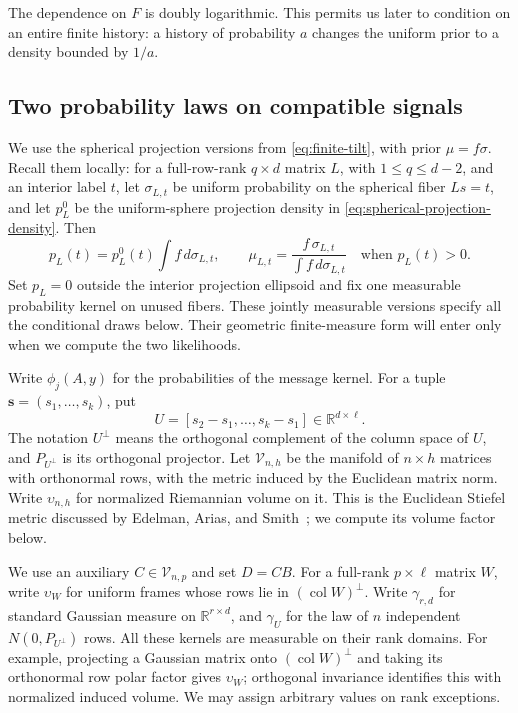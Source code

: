 The dependence on \(F\) is doubly logarithmic.  This permits us later to
condition on an entire finite history: a history of probability \(a\)
changes the uniform prior to a density bounded by \(1/a\).

\subsection{Two probability laws on compatible signals}
\label{inc:laws}

We use the spherical projection versions from
\eqref{eq:finite-tilt}, with prior \(\mu=f\sigma\).  Recall them locally:
for a full-row-rank \(q\times d\) matrix \(L\), with
\(1\le q\le d-2\), and an interior label \(t\), let
\(\sigma_{L,t}\) be uniform probability on the spherical fiber \(Ls=t\),
and let \(p_L^0\) be the uniform-sphere projection density in
\eqref{eq:spherical-projection-density}.  Then
\begin{equation}\label{inc:recalled-fibers}
 p_L(t)=p_L^0(t)\int f\,d\sigma_{L,t},\qquad
 \mu_{L,t}=\frac{f\,\sigma_{L,t}}{\int f\,d\sigma_{L,t}}
 \quad\text{when }p_L(t)>0.
\end{equation}
Set \(p_L=0\) outside the interior projection ellipsoid and fix one
measurable probability kernel on unused fibers.  These jointly measurable
versions specify all the conditional draws below.  Their geometric
finite-measure form will enter only when we compute the two likelihoods.

Write \(\phi_j(A,y)\) for the probabilities of the message kernel.
For a tuple \(\mathbf s=(s_1,\ldots,s_k)\), put
\[
 U=[s_2-s_1,\ldots,s_k-s_1]\in\mathbb R^{d\times\ell}.
\]
The notation \(U^\perp\) means the orthogonal complement of the column
space of \(U\), and \(P_{U^\perp}\) is its orthogonal projector.
Let \(\mathcal V_{n,h}\) be the manifold of \(n\times h\) matrices with
orthonormal rows, with the metric induced by the Euclidean matrix norm.
Write \(\upsilon_{n,h}\) for normalized Riemannian volume on it.
This is the Euclidean Stiefel metric discussed by Edelman, Arias, and
Smith~\cite[Section~2.2.1]{EdelmanAriasSmith1998}; we compute its volume
factor below.

We use an auxiliary \(C\in\mathcal V_{n,p}\) and set \(D=CB\).
For a full-rank \(p\times\ell\) matrix \(W\), write \(\upsilon_W\) for
uniform frames whose rows lie in \((\operatorname{col}W)^\perp\).
Write \(\gamma_{r,d}\) for standard Gaussian measure on
\(\mathbb R^{r\times d}\), and \(\gamma_U\) for the law of \(n\)
independent \(N(0,P_{U^\perp})\) rows.  All these kernels are measurable
on their rank domains.  For example, projecting a Gaussian matrix onto
\((\operatorname{col}W)^\perp\) and taking its orthonormal row polar
factor gives \(\upsilon_W\); orthogonal invariance identifies this with
normalized induced volume.  We may assign arbitrary values on rank
exceptions.

